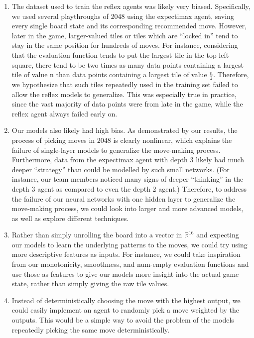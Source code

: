\documentclass[9pt,twocolumn]{article}
\begin{document}
\begin{enumerate}[1)]

\item The dataset used to train the reflex agents was likely very biased. Specifically, we used several playthroughs of 2048 using the expectimax agent, saving every single board state and its corresponding recommended move. However, later in the game, larger-valued tiles or tiles which are “locked in” tend to stay in the same position for hundreds of moves. For instance, considering that the evaluation function tends to put the largest tile in the top left square, there tend to be two times as many data points containing a largest tile of value n than data points containing a largest tile of value $\frac{n}{2}$. Therefore, we hypothesize that such tiles repeatedly used in the training set failed to allow the reflex models to generalize. This was especially true in practice, since the vast majority of data points were from late in the game, while the reflex agent always failed early on.

\item Our models also likely had high bias. As demonstrated by our results, the process of picking moves in 2048 is clearly nonlinear, which explains the failure of single-layer models to generalize the move-making process. Furthermore, data from the expectimax agent with depth 3 likely had much deeper “strategy” than could be modelled by such small networks. (For instance, our team members noticed many signs of deeper “thinking” in the depth 3 agent as compared to even the depth 2 agent.) Therefore, to address the failure of our neural networks with one hidden layer to generalize the move-making process, we could look into larger and more advanced models, as well as explore different techniques.

\item Rather than simply unrolling the board into a vector in $\mathbb{R}^{16}$ and expecting our models to learn the underlying patterns to the moves, we could try using more descriptive features as inputs. For instance, we could take inspiration from our monotonicity, smoothness, and num-empty evaluation functions and use those as features to give our models more insight into the actual game state, rather than simply giving the raw tile values.

\item Instead of deterministically choosing the move with the highest output, we could easily implement an agent to randomly pick a move weighted by the outputs. This would be a simple way to avoid the problem of the models repeatedly picking the same move deterministically.

\end{enumerate}
\end{document}
